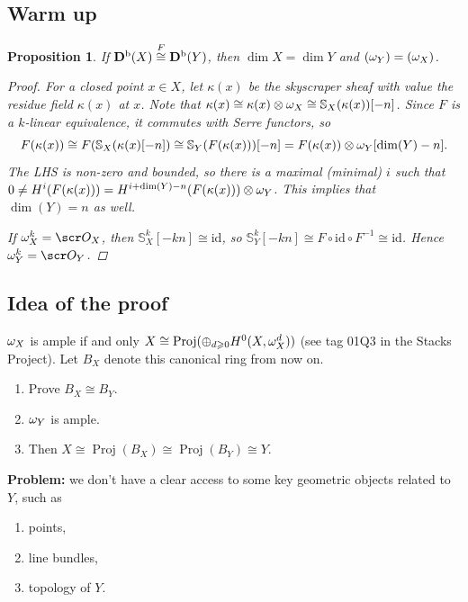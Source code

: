 \documentclass[A4paper, british, reqno]{amsart}
\theoremstyle{darkgreentheorem}
\newtheorem{prop}[thm]{Proposition}
\theoremstyle{darkbluedefinition}
\theoremstyle{darkredexample}
\theoremstyle{remark}
\DeclareMathOperator{\Proj}{Proj}
\DeclareMathOperator{\ord}{ord}
\let\ord\relax
\DeclareMathOperator{\ord}{ord}
\renewcommand{\S}{\mathbb{S}}
\newcommand{\1}{\mathbbm{1}}
\newcommand{\ot}{\otimes}
\newcommand{\op}{\oplus}
\newcommand{\id}{\mathrm{id}}
\begin{document}
\subsection{Warm up}

\begin{prop}
    If $\mathbf{D}^{\mathrm{b}}(X)\overset{F}{\cong} \mathbf{D}^{\mathrm{b}}(Y)$, then $\dim{X}=\dim{Y}$ and $\ord(\w_{Y})=\ord(\w_{X})$.
    \begin{proof}
	For a closed point $x\in X$, let $\kappa(x)$ be the skyscraper sheaf with value the residue field $\kappa(x)$ at $x$.
	Note that $\kappa(x)\cong \kappa(x)\ot \w_{X}\cong \S_{X}(\kappa(x))[-n]$.
	Since $F$ is a $k$-linear equivalence, it commutes with Serre functors, so
	\[ F(\kappa(x))\cong F(\S_{X}(\kappa(x)[-n])\cong \S_{Y}(F(\kappa(x)))[-n]=F(\kappa(x))\ot \w_{Y}[\dim(Y)-n]. \]
	The LHS is non-zero and bounded, so there is a maximal (minimal) $i$ such that $0\neq H^{i}(F(\kappa(x)))=H^{i+\dim(Y)-n}(F(\kappa(x)))\ot \w_{Y}$.
	This implies that $\dim(Y)=n$ as well.

	If $\w_{X}^{k}=\O_{X}$, then $\S_{X}^{k}[-kn]\cong \id$, so $\S_{Y}^{k}[-kn]\cong F\circ \id \circ F^{-1}\cong \id$.
	Hence $\w_{Y}^{k}=\O_{Y}$.
    \end{proof}
\end{prop}

\subsection{Idea of the proof}

$\omega_{X}$ is ample if and only $X\cong \Proj(\op_{d\geqslant 0}H^{0}(X,\w_{X}^{d}))$ (see tag 01Q3 in the Stacks Project).
Let $B_{X}$ denote this canonical ring from now on.

\begin{enumerate}
    \item Prove $B_{X}\cong B_{Y}$.
    \item $\omega_{Y}$ is ample.
    \item Then $X\cong \Proj(B_{X})\cong \Proj(B_{Y})\cong Y$.
\end{enumerate}

\textbf{Problem:} we don't have a clear access to some key geometric objects related to $Y$, such as
\begin{enumerate}
    \item points,
    \item line bundles,
    \item topology of $Y$.
\end{enumerate}
\end{document}
